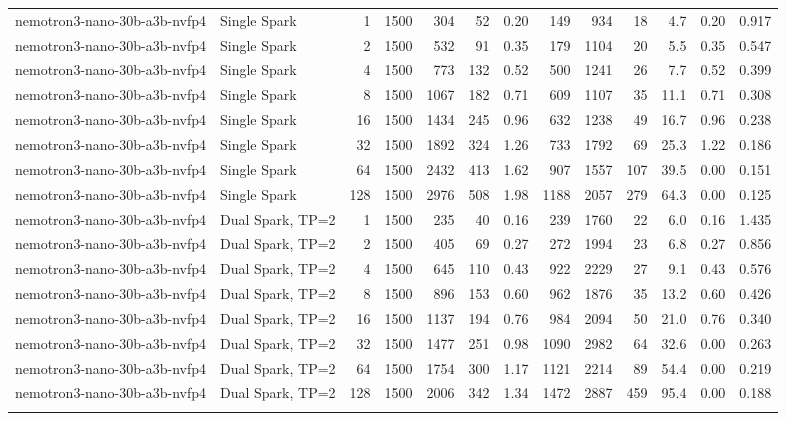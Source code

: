 \begin{tabular}{l l r r r r r r r r r r r}
\addlinespace
nemotron3-nano-30b-a3b-nvfp4 & Single Spark & 1 & 1500 & 304 & 52 & 0.20 & 149 & 934 & 18 & 4.7 & 0.20 & 0.917 \\
nemotron3-nano-30b-a3b-nvfp4 & Single Spark & 2 & 1500 & 532 & 91 & 0.35 & 179 & 1104 & 20 & 5.5 & 0.35 & 0.547 \\
nemotron3-nano-30b-a3b-nvfp4 & Single Spark & 4 & 1500 & 773 & 132 & 0.52 & 500 & 1241 & 26 & 7.7 & 0.52 & 0.399 \\
nemotron3-nano-30b-a3b-nvfp4 & Single Spark & 8 & 1500 & 1067 & 182 & 0.71 & 609 & 1107 & 35 & 11.1 & 0.71 & 0.308 \\
nemotron3-nano-30b-a3b-nvfp4 & Single Spark & 16 & 1500 & 1434 & 245 & 0.96 & 632 & 1238 & 49 & 16.7 & 0.96 & 0.238 \\
nemotron3-nano-30b-a3b-nvfp4 & Single Spark & 32 & 1500 & 1892 & 324 & 1.26 & 733 & 1792 & 69 & 25.3 & 1.22 & 0.186 \\
nemotron3-nano-30b-a3b-nvfp4 & Single Spark & 64 & 1500 & 2432 & 413 & 1.62 & 907 & 1557 & 107 & 39.5 & 0.00 & 0.151 \\
nemotron3-nano-30b-a3b-nvfp4 & Single Spark & 128 & 1500 & 2976 & 508 & 1.98 & 1188 & 2057 & 279 & 64.3 & 0.00 & 0.125 \\
\addlinespace
nemotron3-nano-30b-a3b-nvfp4 & Dual Spark, TP=2 & 1 & 1500 & 235 & 40 & 0.16 & 239 & 1760 & 22 & 6.0 & 0.16 & 1.435 \\
nemotron3-nano-30b-a3b-nvfp4 & Dual Spark, TP=2 & 2 & 1500 & 405 & 69 & 0.27 & 272 & 1994 & 23 & 6.8 & 0.27 & 0.856 \\
nemotron3-nano-30b-a3b-nvfp4 & Dual Spark, TP=2 & 4 & 1500 & 645 & 110 & 0.43 & 922 & 2229 & 27 & 9.1 & 0.43 & 0.576 \\
nemotron3-nano-30b-a3b-nvfp4 & Dual Spark, TP=2 & 8 & 1500 & 896 & 153 & 0.60 & 962 & 1876 & 35 & 13.2 & 0.60 & 0.426 \\
nemotron3-nano-30b-a3b-nvfp4 & Dual Spark, TP=2 & 16 & 1500 & 1137 & 194 & 0.76 & 984 & 2094 & 50 & 21.0 & 0.76 & 0.340 \\
nemotron3-nano-30b-a3b-nvfp4 & Dual Spark, TP=2 & 32 & 1500 & 1477 & 251 & 0.98 & 1090 & 2982 & 64 & 32.6 & 0.00 & 0.263 \\
nemotron3-nano-30b-a3b-nvfp4 & Dual Spark, TP=2 & 64 & 1500 & 1754 & 300 & 1.17 & 1121 & 2214 & 89 & 54.4 & 0.00 & 0.219 \\
nemotron3-nano-30b-a3b-nvfp4 & Dual Spark, TP=2 & 128 & 1500 & 2006 & 342 & 1.34 & 1472 & 2887 & 459 & 95.4 & 0.00 & 0.188 \\
\addlinespace

\end{tabular}
